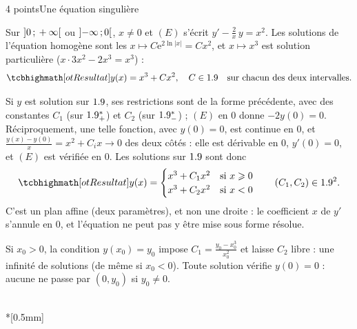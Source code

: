 \begin{corrigeEval}{4 points}{Une équation singulière}
\begin{questions}
  \item Sur $\mathopen{]}0\,{;}\,+\infty\mathclose{[}$ ou $\mathopen{]}-\infty\,{;}\,0\mathclose{[}$, $x\neq0$ et $(E)$
    s'écrit $y'-\frac2x\,y=x^{2}$. Les solutions de l'équation homogène
    sont les $x\mapsto C\mathrm{e}^{2\ln|x|}=Cx^{2}$, et $x\mapsto x^{3}$ est
    solution particulière ($x\cdot3x^{2}-2x^{3}=x^{3}$) :
    \[\res{y(x)=x^{3}+Cx^{2},\quad C\in\R}\quad\text{sur chacun des deux intervalles}.\]
  \item Si $y$ est solution sur $1.9$, ses restrictions sont de la forme
    précédente, avec des constantes $C_1$ (sur $1.9_{+}^{*}$) et $C_2$ (sur
    $1.9_{-}^{*}$) ; $(E)$ en $0$ donne $-2y(0)=0$. Réciproquement, une telle
    fonction, avec $y(0)=0$, est continue en $0$, et
    $\frac{y(x)-y(0)}{x}=x^{2}+C_ix\to0$ des deux côtés : elle est
    dérivable en $0$, $y'(0)=0$, et $(E)$ est vérifiée en $0$. Les solutions
    sur $1.9$ sont donc
    \[\res{y(x)=\begin{cases}x^{3}+C_1x^{2}&\text{si }x\geqslant0\\x^{3}+C_2x^{2}&\text{si }x<0\end{cases}
      \qquad(C_1,C_2)\in\R^{2}}.\]
    C'est un plan affine (deux paramètres), et non une droite : le
    coefficient $x$ de $y'$ s'annule en $0$, et l'équation ne peut pas y être
    mise sous forme résolue. 
  \item Si $x_0>0$, la condition $y(x_0)=y_0$ impose
    $C_1=\frac{y_0-x_0^{3}}{x_0^{2}}$ et laisse $C_2$ libre : une infinité de
    solutions (de même si $x_0<0$). Toute solution vérifie $y(0)=0$ : aucune
    ne passe par $(0,y_0)$ si $y_0\neq0$. \pts{1 pt}
\end{questions}
\begin{center}\begin{minipage}{\linewidth}\centering
{}\\*[0.5mm]
\end{minipage}\end{center}
\end{corrigeEval}

